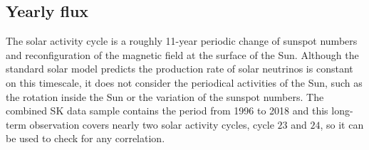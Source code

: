 \documentclass[aps,prd,reprint,superscriptaddress,floatfix,altaffilletter,nofootinbib]{revtex4-2}
\begin{document}
\subsection{Yearly flux}

The solar activity cycle is a roughly 11-year
periodic change of sunspot numbers and reconfiguration of the magnetic field at the surface of the Sun.
Although the standard solar model predicts the production rate of solar neutrinos is constant on this timescale, 
it does not consider the periodical activities of the Sun, such as the rotation inside the Sun or the variation of the sunspot numbers.
The combined SK data sample contains the period from 1996 to 2018 and this long-term observation covers nearly two solar activity cycles, cycle $23$ and $24$, so it can be used to check for any correlation.
\end{document}
